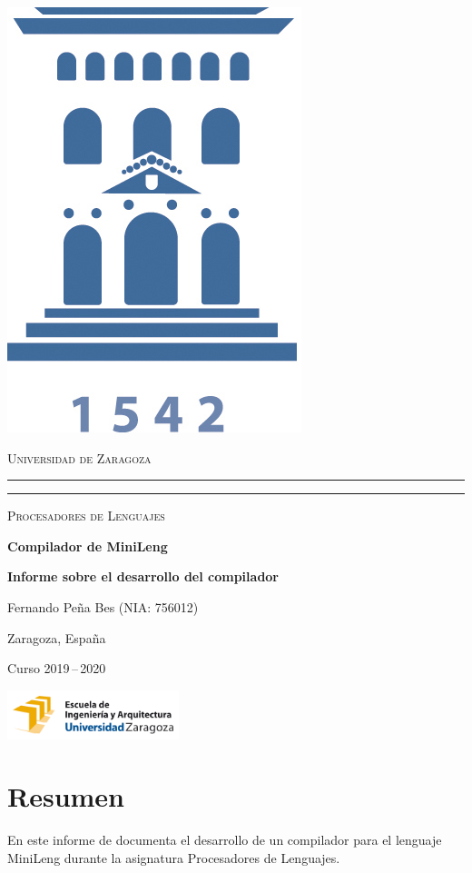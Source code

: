 \documentclass[a4paper,10pt]{article}
\begin{document}
\begin{titlepage}
    \centering
    \includegraphics[width=1 cm]{logoUZ.jpg}
    
    \textsc{\large Universidad de Zaragoza}
    \rule{\textwidth}{1.6pt}\vspace*{-\baselineskip}\vspace*{2pt} %
    \rule{\textwidth}{0.4pt} %
    
    \vfill
    
    {\LARGE \scshape Procesadores de Lenguajes}
                
    \vspace{2cm}            

    {\bfseries \Huge Compilador de MiniLeng}
    
    \vspace{.5cm} 
    
    {\bfseries \Large Informe sobre el desarrollo del compilador}
    
    \vspace{3cm}    
    
   


    
    {\large Fernando Peña Bes (NIA: 756012)}
    
    \vfill
    
    \large{Zaragoza, España}
    
    {Curso 2019\,--\,2020}

    \vfill

    \includegraphics[width=5.0cm]{EINA.png}
   
\end{titlepage}



\vspace*{2cm}
\section*{\hfil Resumen \hfil}
En este informe de documenta el desarrollo de un compilador para el lenguaje MiniLeng durante la asignatura Procesadores de Lenguajes.
\end{document}
